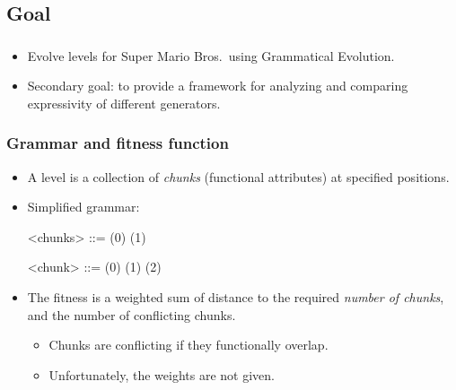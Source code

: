\documentclass{beamer}
\makeatletter
\newcommand*{\currentname}{\@currentlabelname}
\makeatother
\begin{document}
\subsection{Goal}
\begin{frame}
\frametitle{\currentname}
\begin{itemize}
\item Evolve levels for Super Mario Bros.\ using Grammatical Evolution.
\item Secondary goal: to provide a framework for analyzing and comparing expressivity of different generators.
\end{itemize}
\end{frame}

\begin{frame}
\frametitle{Grammar and fitness function}
\begin{itemize}
\item A level is a collection of \textit{chunks} (functional attributes) at specified positions.
\item Simplified grammar:
\vspace{1em}\begin{grammar}
<chunks> ::=  \hfill (0) \hspace{1em}
        \alt {}  \hfill (1) \hspace{1em}
        
<chunk>  ::= \lit*{,}\lit*{,}\lit*{)} \hfill (0) \hspace{1em}
        \alt {}\lit*{,}\lit*{,}\lit*{)} \hfill (1) \hspace{1em}
        \alt {}\lit*{,}\lit*{,}\lit*{)} \hfill (2) \hspace{1em}
        \alt [...]
\end{grammar}\vspace{1em}
\item The fitness is a weighted sum of distance to the required \textit{number of chunks}, and the number of conflicting chunks.
\begin{itemize}
\item Chunks are conflicting if they functionally overlap.
\item Unfortunately, the weights are not given.
\end{itemize}
\end{itemize}
\end{frame}
\end{document}
